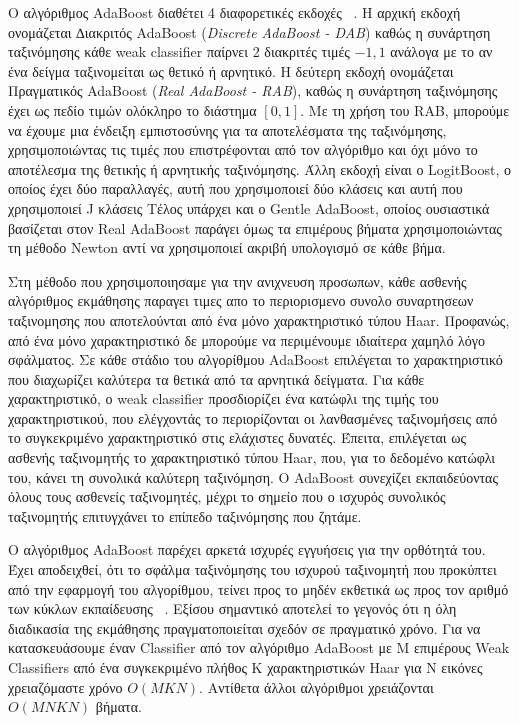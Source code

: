 Ο αλγόριθμος AdaBoost διαθέτει 4 διαφορετικές εκδοχές ~\cite{Friedman98additivelogistic}.
Η αρχική εκδοχή ονομάζεται ∆ιακριτός AdaBoost (\emph{Discrete AdaBoost - DAB}) καθώς η συνάρτηση ταξινόμησης
κάθε weak classifier παίρνει 2 διακριτές τιμές ${-1,1}$ ανάλογα με το αν ένα
δείγμα ταξινομείται ως θετικό ή αρνητικό. Η δεύτερη εκδοχή ονομάζεται Πραγματικός AdaBoost
(\emph{Real AdaBoost - RAB}), καθώς η συνάρτηση ταξινόμησης έχει ως πεδίο τιμών ολόκληρο
το διάστημα $[0,1]$. Με τη χρήση του RAB, μπορούμε να έχουμε μια
ένδειξη εμπιστοσύνης για τα αποτελέσματα της ταξινόμησης, χρησιμοποιώντας τις τιμές που
επιστρέφονται από τον αλγόριθμο και όχι μόνο το αποτέλεσμα της θετικής ή αρνητικής
ταξινόμησης. Άλλη εκδοχή είναι ο LogitBoost, ο οποίος έχει δύο παραλλαγές, αυτή που
χρησιμοποιεί δύο κλάσεις και αυτή που χρησιμοποιεί J κλάσεις
Τέλος υπάρχει και ο Gentle AdaBoost, οποίος ουσιαστικά βασίζεται στον Real AdaBoost
παράγει όμως τα επιμέρους βήματα χρησιμοποιώντας τη μέθοδο Newton αντί να χρησιμοποιεί
ακριβή υπολογισμό σε κάθε βήμα.

Στη μέθοδο που χρησιμοποιησαμε για την ανιχνευση προσωπων, κάθε ασθενής αλγόριθμος
εκμάθησης παραγει τιμες απο το περιορισμενο συνολο συναρτησεων ταξινομησης που αποτελούνται από ένα
μόνο χαρακτηριστικό τύπου Haar. Προφανώς, από ένα μόνο χαρακτηριστικό δε μπορούμε να
περιμένουμε ιδιαίτερα χαμηλό λόγο σφάλματος. Σε κάθε στάδιο του αλγορίθμου AdaBoost
επιλέγεται το χαρακτηριστικό που διαχωρίζει καλύτερα τα θετικά από τα αρνητικά δείγματα. Για
κάθε χαρακτηριστικό, ο weak classifier προσδιορίζει ένα κατώφλι της τιμής του
χαρακτηριστικού, που ελέγχοντάς το περιορίζονται οι λανθασμένες ταξινομήσεις από το
συγκεκριμένο χαρακτηριστικό στις ελάχιστες δυνατές. Έπειτα, επιλέγεται ως ασθενής ταξινομητής
το χαρακτηριστικό τύπου Haar, που, για το δεδομένο κατώφλι του, κάνει τη συνολικά καλύτερη
ταξινόμηση. Ο AdaBoost συνεχίζει εκπαιδεύοντας όλους τους ασθενείς ταξινομητές, μέχρι το
σημείο που ο ισχυρός συνολικός ταξινομητής επιτυγχάνει το επίπεδο ταξινόμησης που ζητάμε.

Ο αλγόριθμος AdaBoost παρέχει αρκετά ισχυρές εγγυήσεις για την ορθότητά του. Έχει
αποδειχθεί, ότι το σφάλμα ταξινόμησης του ισχυρού ταξινομητή που προκύπτει από την εφαρμογή
του αλγορίθμου, τείνει προς το μηδέν εκθετικά ως προς τον αριθμό των κύκλων εκπαίδευσης
~\cite{schapire1998}. Εξίσου σημαντικό αποτελεί το γεγονός ότι η όλη διαδικασία της
εκμάθησης πραγματοποιείται  σχεδόν σε πραγματικό χρόνο.
Για να κατασκευάσουμε έναν Classifier από τον αλγόριθμο AdaBoost με Μ επιμέρους
Weak Classifiers από ένα συγκεκριμένο πλήθος Κ χαρακτηριστικών Haar για Ν εικόνες
χρειαζόμαστε χρόνο $O(MKN)$. Αντίθετα άλλοι αλγόριθμοι χρειάζονται $O(MNKN)$ βήματα.

